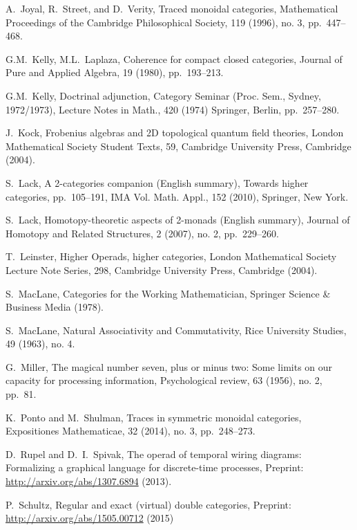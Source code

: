 \documentclass[11pt,oneside,article]{memoir}
\begin{document}
\begin{thebibliography}{XXX}
 A.~Joyal, R.~Street, and D.~Verity, Traced monoidal categories, Mathematical Proceedings of the Cambridge Philosophical Society, 119 (1996), no. 3, pp.~447--468.

 G.M.~Kelly, M.L.~Laplaza, Coherence for compact closed categories, Journal of Pure and Applied Algebra, 19 (1980), pp.~193--213.

 G.M.~Kelly, Doctrinal adjunction, Category Seminar (Proc. Sem., Sydney, 1972/1973), Lecture Notes in Math., 420 (1974) Springer, Berlin, pp.~257--280.

 J.~Kock, Frobenius algebras and 2D topological quantum field theories, London Mathematical Society Student Texts, 59, Cambridge University Press, Cambridge (2004).

 S.~Lack, A 2-categories companion (English summary), Towards higher categories, pp.~105--191, IMA Vol. Math. Appl., 152  (2010), Springer, New York.

 S.~Lack, Homotopy-theoretic aspects of 2-monads (English summary), Journal of Homotopy and Related Structures, 2 (2007), no. 2, pp.~229--260.

 T.~Leinster, Higher Operads, higher categories, London Mathematical Society Lecture Note Series, 298, Cambridge University Press, Cambridge (2004).

 S.~MacLane, Categories for the Working Mathematician, Springer Science \& Business Media (1978).

S.~MacLane, Natural Associativity and Commutativity, Rice University Studies, 49 (1963), no. 4.

 G.~Miller, The magical number seven, plus or minus two: Some limits on our capacity for processing information, Psychological review, 63 (1956), no. 2, pp.~81.

 K.~Ponto and M.~Shulman, Traces in symmetric monoidal categories, Expositiones Mathematicae, 32 (2014), no. 3, pp.~248--273.

 D.~Rupel and D.~I.~Spivak, The operad of temporal wiring diagrams: Formalizing a graphical language for discrete-time processes, Preprint: \url{http://arxiv.org/abs/1307.6894} (2013).

 P.~Schultz, Regular and exact (virtual) double categories, Preprint: \url{http://arxiv.org/abs/1505.00712} (2015)


\end{thebibliography}
\end{document}
